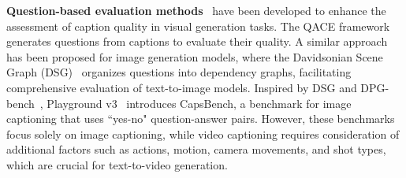 \textbf{Question-based evaluation methods}~\cite{QACE, cho2023davidsonian, playgroundv3} have been developed to enhance the assessment of caption quality in visual generation tasks. The QACE framework~\cite{QACE} generates questions from captions to evaluate their quality. A similar approach has been proposed for image generation models, where the Davidsonian Scene Graph (DSG)~\cite{cho2023davidsonian} organizes questions into dependency graphs, facilitating comprehensive evaluation of text-to-image models. Inspired by DSG and DPG-bench~\cite{Ella}, Playground v3~\cite{playgroundv3} introduces CapsBench, a benchmark for image captioning that uses ``yes-no" question-answer pairs. However, these benchmarks focus solely on image captioning, while video captioning requires consideration of additional factors such as actions, motion, camera movements, and shot types, which are crucial for text-to-video generation.